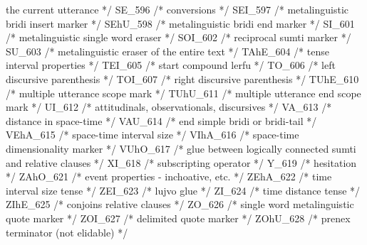                                    the current utterance */
SE_596           /*        conversions */
SEI_597          /*        metalinguistic bridi insert marker */
SEhU_598         /*        metalinguistic bridi end marker */
SI_601           /*        metalinguistic single word eraser */
SOI_602          /*        reciprocal sumti marker */
SU_603           /*        metalinguistic eraser of the entire text */
TAhE_604         /*        tense interval properties */
TEI_605          /*        start compound lerfu */
TO_606           /*        left discursive parenthesis */
TOI_607          /*        right discursive parenthesis */
TUhE_610         /*        multiple utterance scope mark */
TUhU_611         /*        multiple utterance end scope mark */
UI_612           /*        attitudinals, observationals, discursives */
VA_613           /*        distance in space-time */
VAU_614          /*        end simple bridi or bridi-tail */
VEhA_615         /*        space-time interval size */
VIhA_616         /*        space-time dimensionality marker */
VUhO_617         /*        glue between logically connected sumti
                                    and relative clauses */
XI_618           /*        subscripting operator */
Y_619            /*        hesitation */
ZAhO_621         /*        event properties - inchoative, etc. */
ZEhA_622         /*        time interval size tense */
ZEI_623          /*        lujvo glue */
ZI_624           /*        time distance tense */
ZIhE_625         /*        conjoins relative clauses */
ZO_626           /*        single word metalinguistic quote marker */
ZOI_627          /*        delimited quote marker */
ZOhU_628         /*        prenex terminator (not elidable) */

